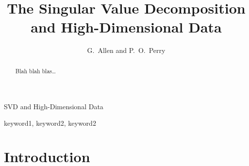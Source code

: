 \documentclass{eoeauth}
\begin{document}
\title{The Singular Value Decomposition and High-Dimensional Data}{SVD and
High-Dimensional Data}

\author{G.\ Allen and P.\ O.\ Perry}


\begin{abstract}
Blah blah blas\ldots
\end{abstract}

\begin{keywords}
keyword1, keyword2, keyword2
\end{keywords}

\section{Introduction}
\end{document}
